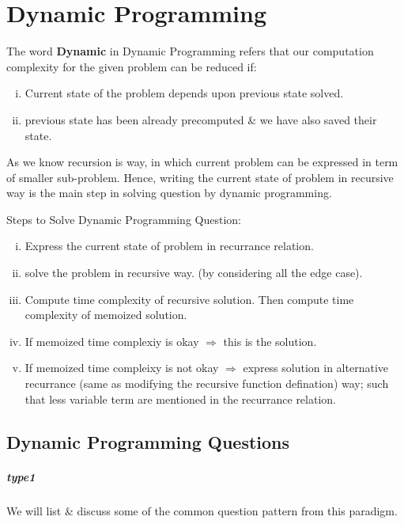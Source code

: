 \chapter{Dynamic Programming}\label{chp:dynamic_programming}



The word \textbf{Dynamic} in Dynamic Programming refers that our computation complexity for the given problem can be reduced if:

\begin{enumerate}[(i)]
    \item Current state of the problem depends upon previous state solved.
    \item previous state has been already precomputed \& we have also saved their state.
\end{enumerate}


As we know recursion is way, in which current problem can be expressed in term of smaller sub-problem. Hence, writing the current state of problem in recursive way is the main step in solving question by dynamic programming.

\vspace{5mm}
Steps to Solve Dynamic Programming Question:
\begin{enumerate}[(i)]
    \itemsep0em 
    \item Express the current state of problem in recurrance relation.
    \item solve the problem in recursive way. (by considering all the edge case).
    \item Compute time complexity of recursive solution. Then compute time complexity of memoized solution.
    \item If memoized time complexiy is okay $\Rightarrow$ this is the solution.
    \item If memoized time compleixy is not okay $\Rightarrow$ express solution in alternative recurrance (same as modifying the recursive function defination) way; such that less variable term are mentioned in the recurrance relation.
\end{enumerate}

\section*{Dynamic Programming Questions}
\paragraph{type1} We will list \& discuss some of the common question pattern from this paradigm.

